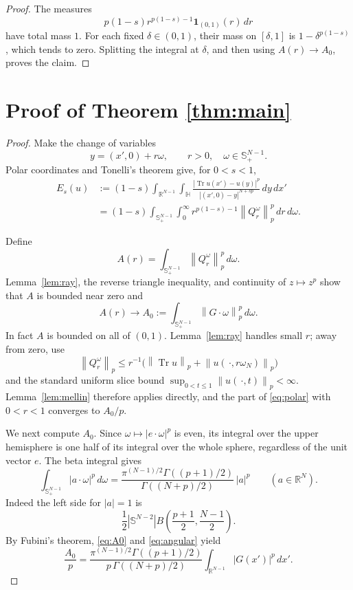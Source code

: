 \documentclass[11pt]{article}
\newcommand{\R}{\mathbb R}
\newcommand{\Hh}{\mathbb H}
\newcommand{\Sp}{\mathbb S^{N-1}_+}
\newcommand{\Tr}{\operatorname{Tr}}
\newcommand{\norm}[1]{\left\lVert #1\right\rVert}
\begin{document}
\begin{proof}
The measures
\[
        p(1-s)r^{p(1-s)-1}\mathbf1_{(0,1)}(r)\,dr
\]
have total mass \(1\).  For each fixed \(\delta\in(0,1)\), their mass on
\([\delta,1]\) is \(1-\delta^{p(1-s)}\), which tends to zero.  Splitting
the integral at \(\delta\), and then using \(A(r)\to A_0\), proves the
claim.
\end{proof}

\section*{Proof of Theorem \ref{thm:main}}

\begin{proof}
Make the change of variables
\[
                y=(x',0)+r\omega,
                \qquad r>0,\quad\omega\in\Sp.
\]
Polar coordinates and Tonelli's theorem give, for \(0<s<1\),
\begin{equation}\label{eq:polar}
\begin{split}
 E_s(u)
 &:=(1-s)
 \int_{\R^{N-1}}\int_{\Hh}
 \frac{|\Tr u(x')-u(y)|^p}
 {|(x',0)-y|^{N+sp}}\,dy\,dx'
\\
 &=(1-s)\int_{\Sp}\int_0^\infty
 r^{p(1-s)-1}\norm{Q_r^\omega}_p^p\,dr\,d\omega.
\end{split}
\end{equation}

Define
\[
                     A(r)=\int_{\Sp}\norm{Q_r^\omega}_p^p\,d\omega.
\]
Lemma~\ref{lem:ray}, the reverse triangle inequality, and continuity of
\(z\mapsto z^p\) show that \(A\) is bounded near zero and
\begin{equation}\label{eq:A0}
 A(r)\longrightarrow
 A_0:=\int_{\Sp}\norm{G\cdot\omega}_p^p\,d\omega.
\end{equation}
In fact \(A\) is bounded on all of \((0,1)\).  Lemma~\ref{lem:ray}
handles small \(r\); away from zero, use
\[
 \norm{Q_r^\omega}_p
 \leq r^{-1}\bigl(\norm{\Tr u}_p+
 \norm{u(\,\cdot,r\omega_N)}_p\bigr)
\]
and the standard uniform slice bound
\(\sup_{0<t\leq1}\norm{u(\,\cdot,t)}_p<\infty\).
Lemma~\ref{lem:mellin} therefore applies directly, and the part of
\eqref{eq:polar} with \(0<r<1\) converges to \(A_0/p\).

We next compute \(A_0\).  Since
\(\omega\mapsto|e\cdot\omega|^p\) is even, its integral over the upper
hemisphere is one half of its integral over the whole sphere, regardless
of the unit vector \(e\).  The beta integral gives
\begin{equation}\label{eq:angular}
 \int_{\Sp}|a\cdot\omega|^p\,d\omega
 =
 \frac{\pi^{(N-1)/2}\Gamma((p+1)/2)}
 {\Gamma((N+p)/2)}\,|a|^p
 \qquad(a\in\R^N).
\end{equation}
Indeed the left side for \(|a|=1\) is
\[
 \frac12|\mathbb S^{N-2}|
 B\!\left(\frac{p+1}{2},\frac{N-1}{2}\right).
\]
By Fubini's theorem, \eqref{eq:A0} and \eqref{eq:angular} yield
\[
 \frac{A_0}{p}
 =
 \frac{\pi^{(N-1)/2}\Gamma((p+1)/2)}
 {p\,\Gamma((N+p)/2)}
 \int_{\R^{N-1}}|G(x')|^p\,dx'.
\]


\end{proof}
\end{document}
